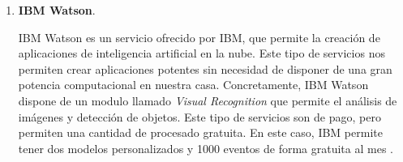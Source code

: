 \begin{enumerate}
	\item \textbf{IBM Watson}.
	
	IBM Watson es un servicio ofrecido por IBM, que permite la creación de aplicaciones de inteligencia artificial en la nube. Este tipo de servicios nos permiten crear aplicaciones potentes sin necesidad de disponer de una gran potencia computacional en nuestra casa. Concretamente, IBM Watson dispone de un modulo llamado \textit{Visual Recognition} que permite el análisis de imágenes y detección de objetos. Este tipo de servicios son de pago, pero permiten una cantidad de procesado gratuita. En este caso, IBM permite tener dos modelos personalizados y 1000 eventos de forma gratuita al mes \cite{ibm}. 
\end{enumerate}



